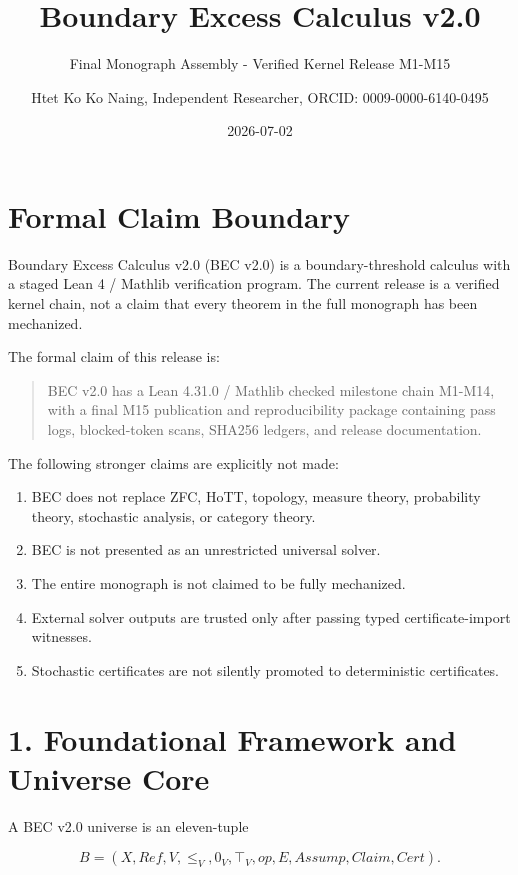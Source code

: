 \documentclass[
  11pt,
]{article}
\title{Boundary Excess Calculus v2.0}
\subtitle{Final Monograph Assembly - Verified Kernel Release M1-M15}
\author{Htet Ko Ko Naing, Independent Researcher, ORCID:
0009-0000-6140-0495}
\date{2026-07-02}
\providecommand{\tightlist}{%
  \setlength{\itemsep}{0pt}\setlength{\parskip}{0pt}}
\begin{document}
\maketitle

\section{Formal Claim Boundary}\label{formal-claim-boundary}

Boundary Excess Calculus v2.0 (BEC v2.0) is a boundary-threshold
calculus with a staged Lean 4 / Mathlib verification program. The
current release is a verified kernel chain, not a claim that every
theorem in the full monograph has been mechanized.

The formal claim of this release is:

\begin{quote}
BEC v2.0 has a Lean 4.31.0 / Mathlib checked milestone chain M1-M14,
with a final M15 publication and reproducibility package containing pass
logs, blocked-token scans, SHA256 ledgers, and release documentation.
\end{quote}

The following stronger claims are explicitly not made:

\begin{enumerate}
\def\labelenumi{\arabic{enumi}.}
\tightlist
\item
  BEC does not replace ZFC, HoTT, topology, measure theory, probability
  theory, stochastic analysis, or category theory.
\item
  BEC is not presented as an unrestricted universal solver.
\item
  The entire monograph is not claimed to be fully mechanized.
\item
  External solver outputs are trusted only after passing typed
  certificate-import witnesses.
\item
  Stochastic certificates are not silently promoted to deterministic
  certificates.
\end{enumerate}

\section{1. Foundational Framework and Universe
Core}\label{foundational-framework-and-universe-core}

A BEC v2.0 universe is an eleven-tuple

\[
B=(X, Ref, V,\le_V,0_V,\top_V,op,E,Assump,Claim,Cert).
\]
\end{document}
